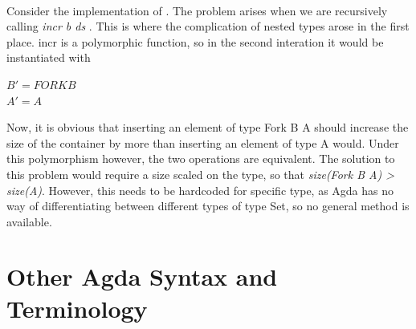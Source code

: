 \documentclass[12pt,twoside,notitlepage]{report}
\begin{document}
\begin{code}
\\
\>[4]\<[10]%
\>[10]    \AgdaSymbol{\{}\AgdaSymbol{\}}\<%
\\
\>[4]\<[10]%
\>[10]    \AgdaSymbol{\{} \AgdaSymbol{\}}\<%
\\
\>[0]\<[4]%
\>[4]   \AgdaSymbol{=}   \<%
\\
\>[0]\<[4]%
\>[4]  \AgdaSymbol{(}  \AgdaSymbol{)} \AgdaSymbol{=}  \AgdaSymbol{(}  \AgdaSymbol{)} \<%
\\
\>[0]\<[4]%
\>[4]  \AgdaSymbol{(}  \AgdaSymbol{)} \AgdaSymbol{=} \AgdaSymbol{\{!   !\}} \<[34]%
\>[34]\<%
\\
\end{code}


Consider the implementation of . The problem arises when we are recursively calling \textit{incr b ds} . This is where the complication of nested types arose in the first place. incr is a polymorphic function, so in the second interation it would be instantiated with 
\begin{center}
$ B' = FORK B$ \\
$ A' = A $ \\
\end{center}
Now, it is obvious that inserting an element of type Fork B A should increase the size of the container by more than inserting an element of type A would. Under this polymorphism however, the two operations are equivalent.
The solution to this problem would require a size scaled on the type, so that\textit{ size(Fork B A) > size(A)}. However, this needs to be hardcoded for specific type, as Agda has no way of differentiating between different types of type Set, so no general method is available.

\section{Other Agda Syntax and Terminology}
\end{document}
